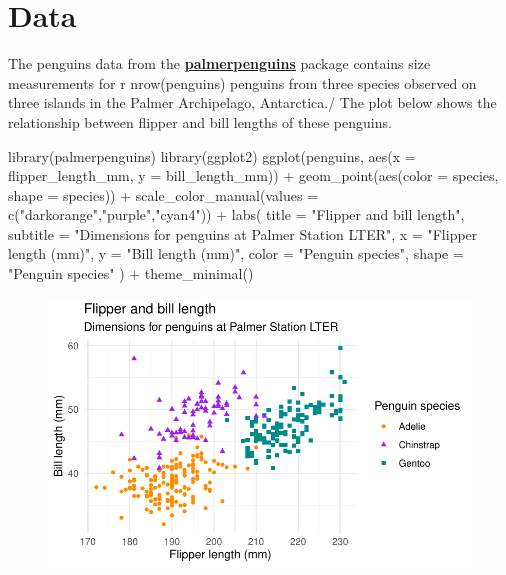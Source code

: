 \documentclass[
  a4paper,
]{scrbook}
\newenvironment{Shaded}{}{}
\newcommand{\AttributeTok}[1]{\textcolor[rgb]{0.84,0.23,0.29}{#1}}
\newcommand{\FunctionTok}[1]{\textcolor[rgb]{0.44,0.26,0.76}{#1}}
\newcommand{\NormalTok}[1]{\textcolor[rgb]{0.14,0.16,0.18}{#1}}
\newcommand{\SpecialCharTok}[1]{\textcolor[rgb]{0.00,0.36,0.77}{#1}}
\newcommand{\StringTok}[1]{\textcolor[rgb]{0.01,0.18,0.38}{#1}}
\begin{document}
\hypertarget{data}{%
\section{Data}\label{data}}

The penguins data from the
\href{https://allisonhorst.github.io/palmerpenguins}{\textbf{palmerpenguins}}
package contains size measurements for r nrow(penguins) penguins from
three species observed on three islands in the Palmer Archipelago,
Antarctica./ The plot below shows the relationship between flipper and
bill lengths of these penguins.

\begin{Shaded}
\begin{Highlighting}[numbers=left,,]
\FunctionTok{library}\NormalTok{(palmerpenguins)}
\FunctionTok{library}\NormalTok{(ggplot2)}
\FunctionTok{ggplot}\NormalTok{(penguins, }
       \FunctionTok{aes}\NormalTok{(}\AttributeTok{x =}\NormalTok{ flipper\_length\_mm, }\AttributeTok{y =}\NormalTok{ bill\_length\_mm)) }\SpecialCharTok{+}
  \FunctionTok{geom\_point}\NormalTok{(}\FunctionTok{aes}\NormalTok{(}\AttributeTok{color =}\NormalTok{ species, }\AttributeTok{shape =}\NormalTok{ species)) }\SpecialCharTok{+}
  \FunctionTok{scale\_color\_manual}\NormalTok{(}\AttributeTok{values =} \FunctionTok{c}\NormalTok{(}\StringTok{"darkorange"}\NormalTok{,}\StringTok{"purple"}\NormalTok{,}\StringTok{"cyan4"}\NormalTok{)) }\SpecialCharTok{+}
  \FunctionTok{labs}\NormalTok{(}
    \AttributeTok{title =} \StringTok{"Flipper and bill length"}\NormalTok{,}
    \AttributeTok{subtitle =} \StringTok{"Dimensions for penguins at Palmer Station LTER"}\NormalTok{,}
    \AttributeTok{x =} \StringTok{"Flipper length (mm)"}\NormalTok{, }\AttributeTok{y =} \StringTok{"Bill length (mm)"}\NormalTok{,}
    \AttributeTok{color =} \StringTok{"Penguin species"}\NormalTok{, }\AttributeTok{shape =} \StringTok{"Penguin species"}
\NormalTok{  ) }\SpecialCharTok{+}
  \FunctionTok{theme\_minimal}\NormalTok{()}
\end{Highlighting}
\end{Shaded}

\begin{figure}[H]

{\centering \includegraphics{./resultats_files/figure-pdf/plot-penguins-1.pdf}

}

\end{figure}
\end{document}
